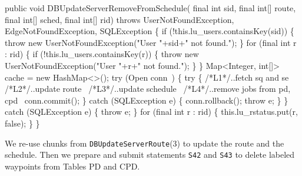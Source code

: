 \documentclass{article}
\def\nwendcode{\endtrivlist \endgroup}      %
\let\nwdocspar=\par
\theoremstyle{definition}                   %
\begin{document}
public void DBUpdateServerRemoveFromSchedule(
    final int sid, final int[] route, final int[] sched, final int[] rid)
throws UserNotFoundException, EdgeNotFoundException, SQLException \{
  if (!this.lu_users.containsKey(sid)) \{
    throw new UserNotFoundException("User "+sid+" not found.");
  \}
  for (final int r : rid) \{
    if (!this.lu_users.containsKey(r)) \{
      throw new UserNotFoundException("User "+r+" not found.");
    \}
  \}
  Map<Integer, int[]> cache = new HashMap<>();
  try (\LA{}Open \code{}conn\edoc{}~{\nwtagstyle{}}\RA{}) \{
    try \{
/*L1*/\LA{}..fetch \code{}sq\edoc{} and \code{}se\edoc{}~{\nwtagstyle{}}\RA{}
/*L2*/\LA{}..update route~{\nwtagstyle{}}\RA{}
/*L3*/\LA{}..update schedule~{\nwtagstyle{}}\RA{}
/*L4*/\LA{}..remove jobs from pd, cpd~{\nwtagstyle{}}\RA{}
      conn.commit();
    \} catch (SQLException e) \{
      conn.rollback();
      throw e;
    \}
  \} catch (SQLException e) \{
    throw e;
  \}
\eatline
{}\nwendcode{}
\nwenddocs{}\plusendmoddef
  for (final int r : rid) \{
    this.lu_rstatus.put(r, false);
  \}
\}
\nwendcode{}\nwdocspar
{\small We re-use chunks from {\tt{}\protect{}DBUpdateServerRoute}(3) to update the route
and the schedule. Then we prepare and submit statements {\tt{}\protect{}S42} and {\tt{}\protect{}S43} to
delete labeled waypoints from Tables PD and CPD.}
\end{document}
